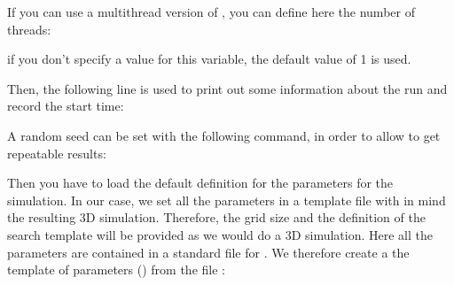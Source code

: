 \documentclass[letterpaper,10pt,english]{sphinxmanual}
\begin{document}
If you can use a multi\sphinxhyphen{}thread version of , you can define here
the number of threads:

\begin{sphinxVerbatim}[commandchars=\\\{\}]
  
\end{sphinxVerbatim}

if you don’t specify a value for this variable, the default value of 1
is used.

Then, the following line is used to print out some information about
the run and record the start time:

\begin{sphinxVerbatim}[commandchars=\\\{\}]
  
\end{sphinxVerbatim}

A random seed can be set with the following command, in order to allow
to get repeatable results:

\begin{sphinxVerbatim}[commandchars=\\\{\}]
  
\end{sphinxVerbatim}

Then you have to load the default definition for the parameters for
the  simulation. In our case, we set all the parameters in a
template file with in mind the resulting 3D simulation. Therefore, the
grid size and the definition of the search template will be provided
as we would do a 3D simulation.  Here all the parameters are contained
in a standard  file for .  We therefore create a the
template of parameters () from the file
:

\begin{sphinxVerbatim}[commandchars=\\\{\}]
  
  
\end{sphinxVerbatim}
\end{document}
